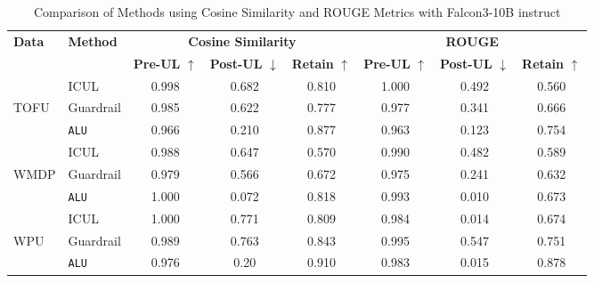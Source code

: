 \begin{table*}[]
    \centering
    \caption{Comparison of Methods using Cosine Similarity and ROUGE Metrics with Falcon3-10B instruct}
    \begin{tabular}{llccc|ccc}
        \toprule
        \textbf{Data}&\textbf{Method} & \multicolumn{3}{c}{\textbf{Cosine Similarity}} & \multicolumn{3}{c}{\textbf{ROUGE}} \\
        \cmidrule(lr){3-5} \cmidrule(lr){6-8}
         & & \textbf{Pre-UL} $\uparrow$ & \textbf{Post-UL} $\downarrow$ & \textbf{Retain} $\uparrow$ & \textbf{Pre-UL} $\uparrow$ & \textbf{Post-UL} $\downarrow$ & \textbf{Retain} $\uparrow$ \\
        \midrule
        &ICUL & 0.998 & 0.682 & 0.810 & 1.000 & 0.492 & 0.560 \\
        TOFU &Guardrail & 0.985 & 0.622 & 0.777 & 0.977 & 0.341 & 0.666 \\
        &\texttt{ALU}  & 0.966 & 0.210 & 0.877 & 0.963 & 0.123 & 0.754 \\
        \midrule
        &ICUL  & 0.988 & 0.647 & 0.570 & 0.990 & 0.482 & 0.589 \\
        WMDP & Guardrail  & 0.979 & 0.566 & 0.672 & 0.975 & 0.241 & 0.632 \\
        &\texttt{ALU} & 1.000 & 0.072 & 0.818 & 0.993 & 0.010 & 0.673 \\
        \midrule
        &ICUL  &1.000 & 0.771 & 0.809 & 0.984 & 0.014 & 0.674 \\
        WPU &Guardrail & 0.989 & 0.763 & 0.843 & 0.995 & 0.547 & 0.751 \\
        &\texttt{ALU} & 0.976 & 0.20 & 0.910 & 0.983 & 0.015 & 0.878 \\
        
        \bottomrule
    \end{tabular}
\label{tab:t26}    
\end{table*}

